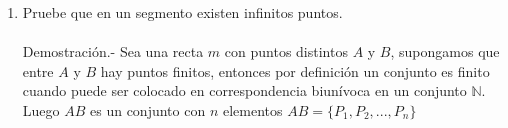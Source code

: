 \documentclass[10pt]{article}
\begin{document}
\begin{enumerate}
\begin{enumerate}[\bfseries (a)]
	\end{enumerate}

    \item Pruebe que en un segmento existen infinitos puntos.\\\\
    Demostración.-\; Sea una recta $m$ con puntos distintos $A$ y $B$, supongamos que entre $A$ y $B$ hay puntos finitos, entonces por definición un conjunto es finito cuando puede ser colocado en correspondencia biunívoca en un conjunto $\mathbb{N}$. Luego $AB$ es un conjunto con $n$ elementos $AB=\lbrace P_1,P_2,...,P_n \rbrace$\\\\


\end{enumerate}
\end{document}
